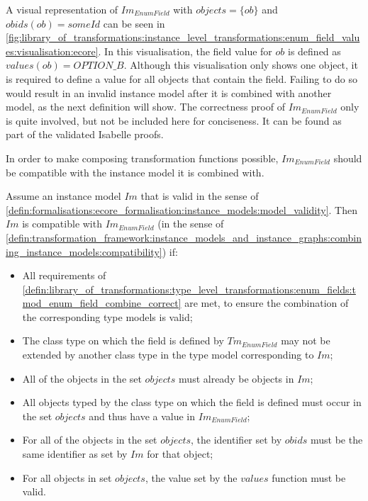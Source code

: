 A visual representation of $Im_{EnumField}$ with $objects = \{ob\}$ and $obids(ob) = someId$ can be seen in \cref{fig:library_of_transformations:instance_level_transformations:enum_field_values:visualisation:ecore}. In this visualisation, the field value for $ob$ is defined as $values(ob) = OPTION\!\_B$. Although this visualisation only shows one object, it is required to define a value for all objects that contain the field. Failing to do so would result in an invalid instance model after it is combined with another model, as the next definition will show. The correctness proof of $Im_{EnumField}$ only is quite involved, but not be included here for conciseness. It can be found as part of the validated Isabelle proofs.

In order to make composing transformation functions possible, $Im_{EnumField}$ should be compatible with the instance model it is combined with.

\begin{thm}
\label{defin:library_of_transformations:instance_level_transformations:enum_field_values:imod_enum_field_combine_correct}
Assume an instance model $Im$ that is valid in the sense of \cref{defin:formalisations:ecore_formalisation:instance_models:model_validity}. Then $Im$ is compatible with $Im_{EnumField}$ (in the sense of \cref{defin:transformation_framework:instance_models_and_instance_graphs:combining_instance_models:compatibility}) if:
\begin{itemize}
    \item All requirements of \cref{defin:library_of_transformations:type_level_transformations:enum_fields:tmod_enum_field_combine_correct} are met, to ensure the combination of the corresponding type models is valid;
    \item The class type on which the field is defined by $Tm_{EnumField}$ may not be extended by another class type in the type model corresponding to $Im$;
    \item All of the objects in the set $objects$ must already be objects in $Im$;
    \item All objects typed by the class type on which the field is defined must occur in the set $objects$ and thus have a value in $Im_{EnumField}$;
    \item For all of the objects in the set $objects$, the identifier set by $obids$ must be the same identifier as set by $Im$ for that object;
    \item For all objects in set $objects$, the value set by the $values$ function must be valid.
\end{itemize}
\end{thm}

